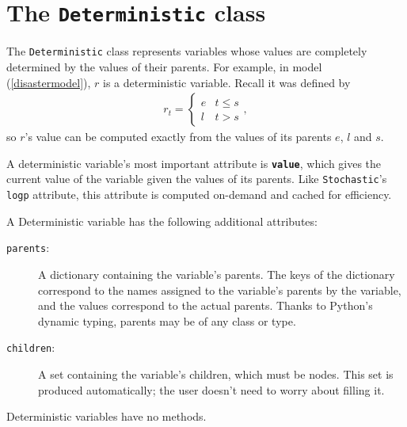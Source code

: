 \hypertarget{deterministic}{}
\section*{The \texttt{Deterministic} class} \label{deterministic}

The \texttt{Deterministic} class represents variables whose values are completely determined by the values of their parents. For example, in model (\ref{disastermodel}), $r$ is a deterministic variable. Recall it was defined by
\begin{eqnarray*}
    r_t=\left\{\begin{array}{ll}
        e & t\le s\\ l & t>s
        \end{array}\right.,
\end{eqnarray*}
so $r$'s value can be computed exactly from the values of its parents $e$, $l$ and $s$.

A deterministic variable's most important attribute is \texttt{\bfseries value}, which gives the current value of the variable given the values of its parents. Like \texttt{Stochastic}'s \texttt{logp} attribute, this attribute is computed on-demand and cached for efficiency.

A Deterministic variable has the following additional attributes:
\begin{description}
    \item[\texttt{parents}:] A dictionary containing the variable's parents. The keys of the dictionary correspond to the names assigned to the variable's parents by the variable, and the values correspond to the actual parents. Thanks to Python's dynamic typing, parents may be of any class or type.
    \item[\texttt{children}:] A set containing the variable's children, which must be nodes. This set is produced automatically; the user doesn't need to worry about filling it.
\end{description}
Deterministic variables have no methods.


